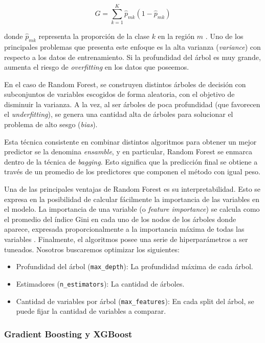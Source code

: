 \begin{equation*}
    G = \sum_{k = 1}^{K} \hat{p}_{mk}(1 - \hat{p}_{mk})
\end{equation*}

donde $\hat{p}_{mk}$ representa la proporción de la clase $k$ en la región $m$ \cite{Hastie2001}. Uno de los principales problemas que presenta este enfoque es la alta varianza (\textit{variance}) con respecto a los datos de entrenamiento. Si la profundidad del árbol es muy grande, aumenta el riesgo de \textit{overfitting} en los datos que poseemos. 

En el caso de Random Forest, se construyen distintos árboles de decisión con subconjuntos de variables escogidos de forma aleatoria, con el objetivo de disminuir la varianza. A la vez, al ser árboles de poca profundidad (que favorecen el \textit{underfitting}), se genera una cantidad alta de árboles para solucionar el problema de alto sesgo (\textit{bias}). 

Esta técnica consistente en combinar distintos algoritmos para obtener un mejor predictor se la denomina \textit{ensamble}, y en particular, Random Forest se enmarca dentro de la técnica de \textit{bagging}. Esto significa que la predicción final se obtiene a través de un promedio de los predictores que componen el método con igual peso.

Una de las principales ventajas de Random Forest es su interpretabilidad. Esto se expresa en la posibilidad de calcular fácilmente la importancia de las variables en el modelo. La importancia de una variable (o \textit{feature importance}) se calcula como el promedio del índice Gini en cada uno de los nodos de los árboles donde aparece, expresada proporcionalmente a la importancia máxima de todas las variables \cite{Hastie2001}.
Finalmente, el algoritmos posee una serie de hiperparámetros a ser tuneados. Nosotros buscaremos optimizar los siguientes:

\begin{itemize}
    \item Profundidad del árbol (\texttt{max\_depth}): La profundidad máxima de cada árbol.
    \item Estimadores (\texttt{n\_estimators}): La cantidad de árboles.
    \item Cantidad de variables por árbol (\texttt{max\_features}): En cada split del árbol, se puede fijar la cantidad de variables a comparar.
\end{itemize}

\subsubsection{Gradient Boosting y XGBoost}

